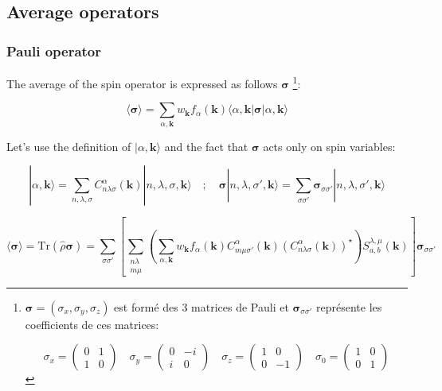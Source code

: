 \documentclass{article}
\newcommand{\bra}[1]{\langle #1|}
\newcommand{\ket}[1]{|#1\rangle}
\newcommand{\op}[1]{\hat{#1}}
\begin{document}
\subsection{Average operators}


\subsubsection{Pauli operator}

\noindent
The average of the spin operator is expressed as follows
$\bm{\sigma}$
\footnote{\noindent 
${\bm{\sigma}}=(\sigma_x,\sigma_y,\sigma_z)$ est
form\'e des 3 matrices de Pauli et $\bm{\sigma}_{\sigma \sigma'}$ repr\'esente les coefficients de ces matrices:


\[ \sigma_x=\left( \begin{array}{cc} 0 & 1 \\ 1 & 0 \end{array} \right) 
\quad
\sigma_y=\left( \begin{array}{cc} 0 & -i \\ i & 0 \end{array} \right) \quad
\sigma_z=\left( \begin{array}{cc} 1 & 0 \\ 0 & -1 \end{array} \right) \quad
\sigma_0=\left( \begin{array}{cc} 1 & 0 \\ 0 & 1 \end{array}\right) \]}: 

\[ \langle \bm{\sigma}\rangle= \sum_{\alpha,\mathbf{k}}
w_{\mathbf{k}}f_{\alpha}(\mathbf{k}) \bra{\alpha,\mathbf{k}}\bm{\sigma}\ket{\alpha,\mathbf{k}}\]

\noindent
Let's use the definition of $|\alpha,\mathbf{k}\rangle$ and the fact that $\bm{\sigma}$ acts only on spin variables:

\[ \displaystyle \ket{\alpha , \mathbf{k}}= 
\sum_{n,\lambda, \sigma} C_{n \lambda \sigma}^{\alpha}(\mathbf{k}) \ket{n,\lambda, \sigma, \mathbf{k}}
\quad ; \quad 
\bm{\sigma}\ket{n,\lambda, \sigma', \mathbf{k}}=
\sum_{\sigma \sigma'} \bm{\sigma}_{\sigma \sigma'} \ket{n,\lambda, \sigma', \mathbf{k}}
\]


\[ \langle \bm{\sigma}\rangle=\text{Tr}(\op{\rho} \bm{\sigma})= 
\sum_{\sigma \sigma'} \left[ 
\sum_{\substack{n \lambda\\ m \mu}}
\left( \sum_{\alpha,\mathbf{k}} w_{\mathbf{k}} f_{\alpha}(\mathbf{k}) 
C_{m\mu \sigma'}^{\alpha}(\mathbf{k})(C_{n \lambda \sigma}^{\alpha}(\mathbf{k}))^{\star} \right)
S_{a,b}^{\lambda,\mu}(\mathbf{k}) \right] \bm{\sigma}_{\sigma \sigma'} \]
\end{document}
